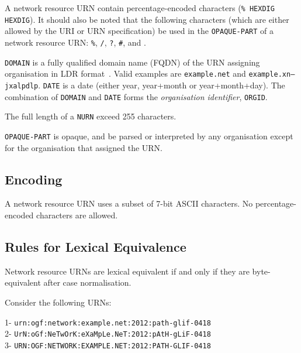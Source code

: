 \documentclass[12pt]{article}  %
\begin{document}
A network resource URN \MUSTNOT{} contain percentage-encoded characters (\texttt{\qq\%\qq{} HEXDIG HEXDIG}). It should also be noted that the following characters (which are either allowed by the URI or URN specification) \MUSTNOT{} be used in the \texttt{OPAQUE-PART} of a network resource URN: \texttt{\qq\%\qq}, \texttt{\qq/\qq}, \texttt{\qq{}?\qq}, \texttt{\qq\#\qq}, and \texttt{\qq{}\q{}\qq{}}. 


\texttt{DOMAIN} is a fully qualified domain name (FQDN) of the URN assigning organisation 
in LDR format~\cite{rfc5890}. 
Valid examples are \texttt{example.net} and \texttt{example.xn--jxalpdlp}. 
\texttt{DATE} is a date (either year, year+month or year+month+day).
The combination of \texttt{DOMAIN} and \texttt{DATE} forms the \emph{organisation identifier}, \texttt{ORGID}.

The full length of a \texttt{NURN} \MUSTNOT{} exceed 255 characters.

\texttt{OPAQUE-PART} is opaque, and \MUSTNOT{} be parsed or interpreted by any 
organisation except for the organisation that assigned the URN.

\subsection{Encoding}

A network resource URN uses a subset of 7-bit ASCII characters. 
No percentage-encoded characters are allowed.

\subsection{Rules for Lexical Equivalence}

Network resource URNs are lexical equivalent if and only if they are byte-equivalent after case normalisation.

Consider the following URNs:

  1- \texttt{urn:ogf:network:example.net:2012:path-glif-0418} \\
  2- \texttt{UrN:oGf:NeTwOrK:eXaMpLe.NeT:2012:pAtH-gLiF-0418} \\
  3- \texttt{URN:OGF:NETWORK:EXAMPLE.NET:2012:PATH-GLIF-0418} \\
\end{document}

